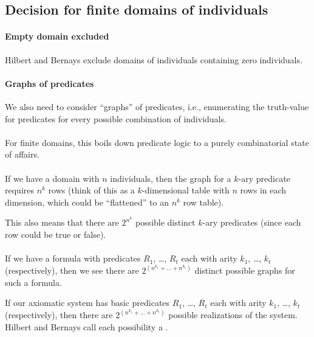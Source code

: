 \subsection{Decision for finite domains of individuals}

\paragraph{Empty domain excluded}
Hilbert and Bernays exclude domains of individuals containing zero
individuals. 

\paragraph{Graphs of predicates}
We also need to consider ``graphs'' of predicates, i.e., enumerating
the truth-value for predicates for every possible combination of
individuals.

\paragraph{}
For finite domains, this boils down predicate logic to a purely
combinatorial state of affairs.

\paragraph{}
If we have a domain with $n$ individuals, then the graph for a $k$-ary
predicate requires $n^{k}$ rows (think of this as a $k$-dimensional
table with $n$ rows in each dimension, which could be ``flattened'' to
an $n^{k}$ row table).

This also means that there are $2^{n^{k}}$ possible distinct $k$-ary
predicates (since each row could be true or false).

\paragraph{}
If we have a formula with predicates $R_{1}$, \dots, $R_{t}$ each with
arity $k_{1}$, \dots, $k_{t}$ (respectively), then we see there are
$2^{(n^{k_{1}}+\dots+n^{k_{t}})}$ distinct possible graphs for such a formula.

If our axiomatic system has basic predicates $R_{1}$, \dots, $R_{t}$ each with
arity $k_{1}$, \dots, $k_{t}$ (respectively), then there are
$2^{(n^{k_{1}}+\dots+n^{k_{t}})}$ possible realizations of the system.
Hilbert and Bernays call each possibility a .

